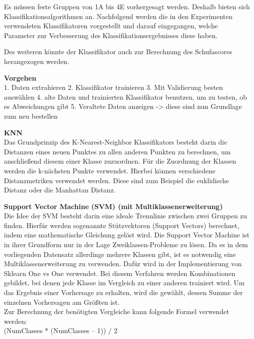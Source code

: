 

Es müssen feste Gruppen von 1A bis 4E vorhergesagt werden. Deshalb bieten sich Klassifikationsalgorithmen an.
Nachfolgend werden die in den Experimenten verwendeten Klassifikatoren vorgestellt und darauf eingegangen, welche Parameter zur Verbesserung des Klassifikationsergebnisses diese haben.

Des weiteren könnte der Klassifikator auch zur Berechnung des Schufascores herangezogen werden. 


\textbf{Vorgehen} \\
1. Daten extrahieren
2. Klassifikator trainieren 
3. Mit Validierung besten auswählen
4. alte Daten und trainierten Klassifikator benutzen, um zu testen, ob es Abweichungen gibt
5. Veraltete Daten anzeigen -> diese sind nun Grundlage zum neu bestellen

\textbf{KNN} \\
Das Grundprinzip des K-Nearest-Neighbor Klassifikators besteht darin die Distanzen eines neuen Punktes zu allen anderen Punkten zu berechnen, um anschließend diesem einer Klasse zuzuordnen.
Für die Zuordnung der Klassen werden die k-nächsten Punkte verwendet.
Hierbei können verschiedene Distanzmetriken verwendet werden. 
Diese sind zum Beispiel die euklidische Distanz oder die Manhattan Distanz.


\textbf{Support Vector Machine (SVM) (mit Multiklassenerweiterung)} \\
Die Idee der SVM besteht darin eine ideale Trennlinie zwischen zwei Gruppen zu finden. 
Hierfür werden sogenannte Stützvektoren (Support Vectors) berechnet, indem eine mathematische Gleichung gelöst wird.
Die Support Vector Machine ist in ihrer Grundform nur in der Lage Zweiklassen-Probleme zu lösen.
Da es in dem vorliegenden Datensatz allerdings mehrere Klassen gibt, ist es notwendig eine Multiklassenerweiterung zu verwenden.
Dafür wird in der Implementierung von Sklearn One vs One verwendet. 
Bei diesem Verfahren werden Kombinationen gebildet, bei denen jede Klasse im Vergleich zu einer anderen trainiert wird.
Um das Ergebnis einer Vorhersage zu erhalten, wird die gewählt, dessen Summe der einzelnen Vorhersagen am Größten ist. 
\\ 
Zur Berechnung der benötigten Vergleiche kann folgende Formel verwendet werden:\\
(NumClasses * (NumClasses – 1)) / 2


